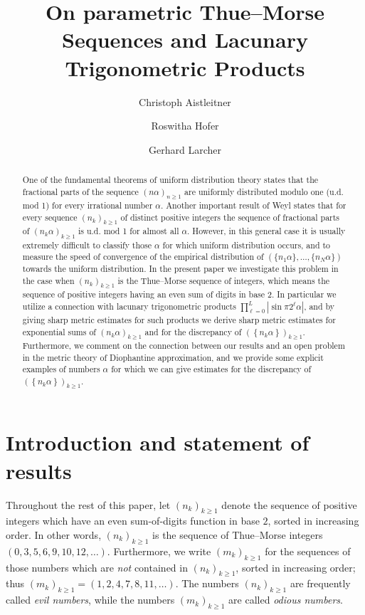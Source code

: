 \documentclass[12pt]{amsart}
\title[On parametric Thue--Morse Sequences and Lacunary Trigonometric Products]{\bf On parametric Thue--Morse Sequences and Lacunary Trigonometric Products}
\author{Christoph Aistleitner}
\author{Roswitha Hofer}
\author{Gerhard Larcher}
\begin{document}
\begin{abstract}
One of the fundamental theorems of uniform distribution theory states that the fractional parts of the sequence $(n \alpha)_{n \geq 1}$ are uniformly distributed modulo one (u.d. mod 1) for every irrational number $\alpha$. Another important result of Weyl states that for every sequence $(n_k)_{k \geq 1}$ of distinct positive integers the sequence of fractional parts of $(n_k \alpha)_{k \geq 1}$ is u.d. mod 1 for almost all $\alpha$. However, in this general case it is usually extremely difficult to classify those $\alpha$ for which uniform distribution occurs, and to measure the speed of convergence of the empirical distribution of $(\{n_1 \alpha\}, \dots, \{n_N \alpha\})$ towards the uniform distribution. In the present paper we investigate this problem in the case when $(n_k)_{k \geq 1}$ is the Thue--Morse sequence of integers, which means the sequence of positive integers having an even sum of digits in base 2. In particular we utilize a connection with lacunary trigonometric products $\prod^{L}_{\ell=0} 
\left|\sin \pi 2^{\ell} \alpha \right|$, and by giving sharp metric estimates for such products we derive sharp metric estimates for exponential sums of $\left(n_{k} \alpha\right)_{k \geq 1}$ and for the discrepancy of $\left(\left\{n_{k} \alpha\right\}\right)_{k \geq 1}.$ Furthermore, we comment on the connection between our results and an open problem in the metric theory of Diophantine approximation, and we provide some explicit examples of numbers $\alpha$ for which we can give estimates for the discrepancy of $\left(\left\{n_{k} \alpha\right\}\right)_{k \geq1}$.
\end{abstract}

\date{}
\maketitle

\section{Introduction and statement of results} \label{sect_int}

Throughout the rest of this paper, let $(n_k)_{k \geq 1}$ denote the sequence of positive integers which have an even sum-of-digits function in base $2$, sorted in increasing order. In other words, $(n_k)_{k \geq 1}$ is the sequence of Thue--Morse integers $(0,3,5,6,9,10,12,\dots)$. Furthermore, we write $(m_k)_{k \geq 1}$ for the sequences of those numbers which are \emph{not} contained in $(n_k)_{k \geq 1}$, sorted in increasing order; thus $(m_k)_{k \geq 1} = (1,2,4,7,8,11,\dots)$. The numbers $(n_k)_{k \geq 1}$ are frequently called \emph{evil numbers}, while the numbers $(m_k)_{k \geq 1}$ are called \emph{odious numbers}.\\
\end{document}
